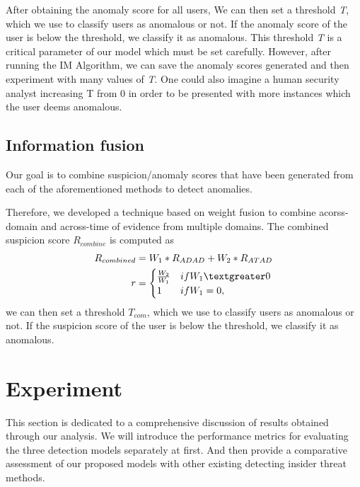 \documentclass[conference]{IEEEtran}
\begin{document}
After obtaining the anomaly score for all users, 
We can then set a threshold \emph{T}, which we use to classify users as anomalous or not. If the anomaly score of the user is below the threshold, we classify it as anomalous. This threshold \emph{T} is a critical parameter of our model which must be set carefully.
However, after running the IM Algorithm, we can save the anomaly scores generated and then experiment with many values of \emph{T}. One could also imagine a human security analyst increasing T from 0 in order to be presented with more instances which the user deems anomalous.
\subsection{Information fusion}
Our goal is to combine suspicion/anomaly scores that have been generated from each of the aforementioned methods to detect anomalies.

Therefore, we developed a technique based on weight fusion to combine acorss-domain and across-time of evidence from multiple domains. The combined suspicion score \emph{$R_{combine}$} is computed as
\begin{align}
R_{combined}&= W_1*R_{ADAD}+W_2*R_{ATAD}\\
r&=\begin{cases}
\frac{W_2}{W_1}
&\mbox{if } W_1 \textgreater 0\\
1
&\mbox{if } W_1 = 0,\\
\end{cases}
\end{align}
we can then set a threshold \emph{$T_{com}$}, which we use to classify users as anomalous or not. If the suspicion score of the user is below the threshold, we classify it as anomalous.

\section{Experiment}

This section is dedicated to a comprehensive discussion of results obtained through our analysis.
We will introduce the performance metrics for evaluating the three detection models separately at first. And then provide a comparative assessment of our proposed models with other existing detecting insider threat methods. 
\end{document}
